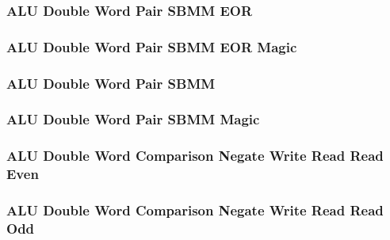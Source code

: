 \subsubsection[{\small ALU Double Word Pair SBMM EOR}]{ALU Double Word Pair SBMM EOR} \label{sec:format-ALU-DPSBMME}



\subsubsection[{\small ALU Double Word Pair SBMM EOR Magic}]{ALU Double Word Pair SBMM EOR Magic} \label{sec:format-ALU-DPSBMME.M}



\subsubsection[{\small ALU Double Word Pair SBMM}]{ALU Double Word Pair SBMM} \label{sec:format-ALU-DPSBMM}



\subsubsection[{\small ALU Double Word Pair SBMM Magic}]{ALU Double Word Pair SBMM Magic} \label{sec:format-ALU-DPSBMM.M}



\subsubsection[{\small ALU Double Word Comparison Negate Write Read Read Even}]{ALU Double Word Comparison Negate Write Read Read Even} \label{sec:format-ALU-DCNWRRE}



\subsubsection[{\small ALU Double Word Comparison Negate Write Read Read Odd}]{ALU Double Word Comparison Negate Write Read Read Odd} \label{sec:format-ALU-DCNWRRO}

